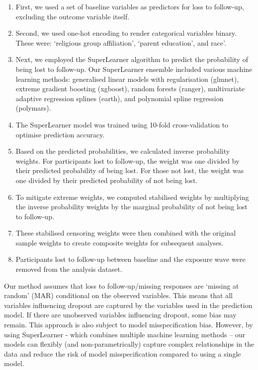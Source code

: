 \documentclass[
  single column]{article}
\begin{document}
\begin{enumerate}
\def\labelenumi{\arabic{enumi}.}
\item
  First, we used a set of baseline variables as predictors for loss to
  follow-up, excluding the outcome variable itself.
\item
  Second, we used one-hot encoding to render categorical variables
  binary. These were: `religious group affiliation', `parent education',
  and race'.
\item
  Next, we employed the SuperLearner algorithm to predict the
  probability of being lost to follow-up. Our SuperLearner ensemble
  included various machine learning methods: generalised linear models
  with regularisation (glmnet), extreme gradient boosting (xgboost),
  random forests (ranger), multivariate adaptive regression splines
  (earth), and polynomial spline regression (polymars).
\item
  The SuperLearner model was trained using 10-fold cross-validation to
  optimise prediction accuracy.
\item
  Based on the predicted probabilities, we calculated inverse
  probability weights. For participants lost to follow-up, the weight
  was one divided by their predicted probability of being lost. For
  those not lost, the weight was one divided by their predicted
  probability of not being lost.
\item
  To mitigate extreme weights, we computed stabilised weights by
  multiplying the inverse probability weights by the marginal
  probability of not being lost to follow-up.
\item
  These stabilised censoring weights were then combined with the
  original sample weights to create composite weights for subsequent
  analyses.
\item
  Participants lost to follow-up between baseline and the exposure wave
  were removed from the analysis dataset.
\end{enumerate}

Our method assumes that loss to follow-up/missing responses are `missing
at random' (MAR) conditional on the observed variables. This means that
all variables influencing dropout are captured by the variables used in
the prediction model. If there are unobserved variables influencing
dropout, some bias may remain. This approach is also subject to model
misspecification bias. However, by using SuperLearner - which combines
multiple machine learning methods -- our models can flexibly (and
non-parametrically) capture complex relationships in the data and reduce
the risk of model misspecification compared to using a single model.
\end{document}
